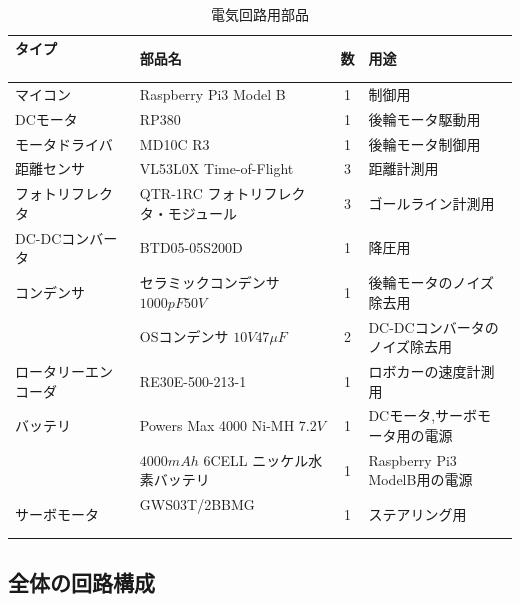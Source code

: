 \begin{table}
　   \caption{電気回路用部品}
　   \label{tab::circuit_parts}
　   \begin{center}
　   \footnotesize
　　　\begin{tabular}{ | l | l | c || l |}\hline
タイプ          　　　　　&部品名              　　　                        &数&用途   \\ \hline\hline
マイコン        　　&Raspberry Pi3 Model B    　                       &1&制御用          　\\ \hline
DCモータ        　　&RP380    　　　　　　　　                    　  &1&後輪モータ駆動用   \\    \hline
モータドライバ      &MD10C R3   　　                                   &1&後輪モータ制御用   \\ \hline
距離センサ        　&VL53L0X Time-of-Flight 　                         &3&距離計測用   \\ \hline
フォトリフレクタ     &QTR-1RC フォトリフレクタ・モジュール              &3&ゴールライン計測用   \\ \hline
DC-DCコンバータ     &BTD05-05S200D                                     &1&降圧用   \\ \hline
コンデンサ          &セラミックコンデンサ$1000\unit{pF}50\unit{V}$ &1&後輪モータのノイズ除去用   \\ \cline{2-4}
                  &OSコンデンサ $10\unit{V}47\unit{\mu F}$                          &2&DC-DCコンバータのノイズ除去用    \\ \hline
ロータリーエンコーダ　&RE30E-500-213-1                                   &1&ロボカーの速度計測用   \\ \hline
バッテリ        　　&Powers Max 4000 Ni-MH $7.2\unit{V}$                        &1&DCモータ,サーボモータ用の電源\\ \cline{2-4}
                  &$4000\unit{mAh}$ 6CELL ニッケル水素バッテリ                &1&Raspberry Pi3 ModelB用の電源    \\ \hline
サーボモータ        &GWS03T/2BBMG 　　　　　　　　                      　&1&ステアリング用   \\    \hline

	   \end{tabular}
	\end{center}
\end{table}





\subsection{全体の回路構成}

